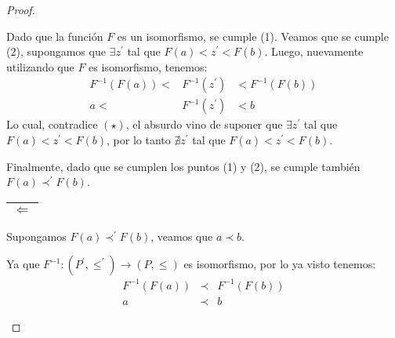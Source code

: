 \begin{proof}
\begin{enumerate}[a)]
        \PN Dado que la función $F$ es un isomorfismo, se cumple (1). Veamos que se cumple (2), supongamos que $\exists
        z^{\prime}$ tal que $F(a) < z^{\prime} < F(b)$. Luego, nuevamente utilizando que $F$ es isomorfismo, tenemos:
        \begin{eqnarray*}
    			F^{-1}(F(a)) < &F^{-1}(z^{\prime})& < F^{-1}(F(b)) \\
    			a < &F^{-1}(z^{\prime})& < b
    		\end{eqnarray*}
        \PN Lo cual, contradice $(\star)$, el absurdo vino de suponer que $\exists z^{\prime}$ tal que
        $F(a) < z^{\prime} < F(b)$, por lo tanto $\nexists z^{\prime}$ tal que $F(a) < z^{\prime} < F(b)$.

        \PN Finalmente, dado que se cumplen los puntos (1) y (2), se cumple también $F(a) \prec^{\prime} F(b)$.

        \PN \begin{tabular}{|c|} \hline $\Leftarrow$ \\\hline \end{tabular} Supongamos $F(a) \prec^{\prime} F(b)$,
        veamos que $a \prec b$.

		    \PN Ya que $F^{-1}: (P^{\prime}, \leq^{\prime}) \rightarrow (P, \leq)$ es isomorfismo, por lo ya visto tenemos:
    		\begin{eqnarray*}
    			F^{-1}(F(a)) &\prec& F^{-1}(F(b)) \\
    			a &\prec& b
    		\end{eqnarray*}
    \end{enumerate}
  \end{proof}

